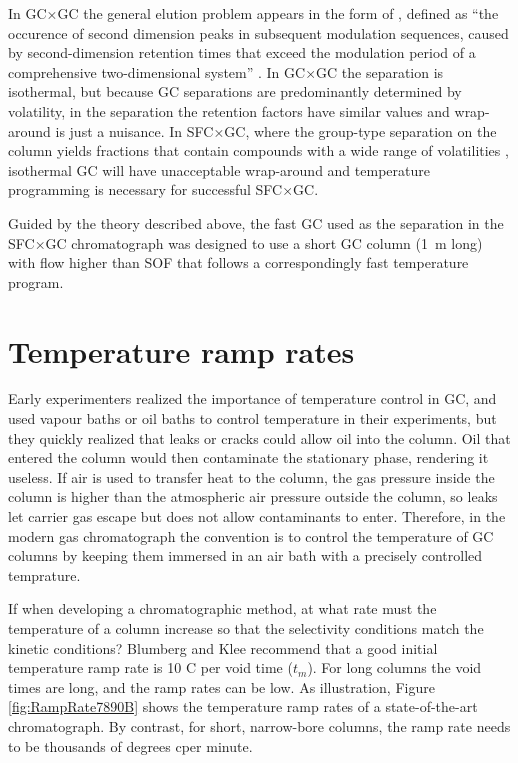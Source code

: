 In GC×GC the general elution problem appears in the form of
, defined as ``the occurence of second dimension peaks in
subsequent modulation sequences, caused by second-dimension retention times that
exceed the modulation period of a comprehensive two-dimensional system''
\autocite{Mariott2012}. In GC×GC the \twoD separation is isothermal, but because
GC separations are predominantly determined by volatility, in the \twoD
separation the retention factors have similar values and wrap-around is just a
nuisance. In SFC×GC, where the group-type separation on the \oneD column yields
fractions that contain compounds with a wide range of volatilities
\autocite{Venter1999a}, isothermal GC will have unacceptable wrap-around and
temperature programming is necessary for successful SFC×GC.

Guided by the theory described above, the fast GC used as the \twoD  separation
in the SFC×GC chromatograph was designed to use a short GC column
(\SI{1}{\metre} long) with flow higher than SOF that follows a correspondingly
fast temperature program.

\section{Temperature ramp rates}
\label{sec:RampRates}

Early experimenters realized the importance of temperature control in GC, and
used vapour baths \autocite{Desty1957} or oil baths \autocite{Eggertsen1956} to
control temperature in their experiments, but they quickly realized that leaks
or cracks could allow oil into the column. Oil that entered the column would
then contaminate the stationary phase, rendering it useless.  If air is used to
transfer heat to the column, the gas pressure inside the column is higher than
the atmospheric air pressure outside the column, so leaks let carrier gas escape
but does not allow contaminants to enter. Therefore, in the modern gas
chromatograph the convention is to control the temperature of GC columns by
keeping them immersed in an air bath with a precisely controlled temprature.

If when developing a chromatographic method, at what rate must the temperature
of a column increase so that the selectivity conditions match the kinetic
conditions? Blumberg and Klee \autocite{Blumberg2000} recommend that a good
initial temperature ramp rate is 10 C\textdegree{} per void time ($t_m$). For
long columns the void times are long, and the ramp rates can be low. As
illustration, Figure \ref{fig:RampRate7890B} shows the temperature ramp rates of
a state-of-the-art chromatograph. By contrast, for short, narrow-bore columns,
the ramp rate needs to be thousands of degrees cper minute.

